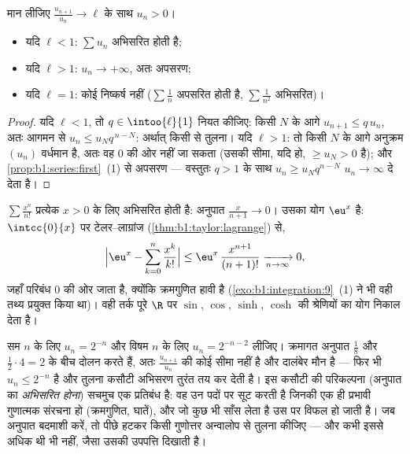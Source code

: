 \begin{theorem}[अनुपात कसौटी (दालंबेर)]\label{thm:b1:series:ratio}
मान लीजिए $\frac{u_{n+1}}{u_n} \to \ell$ के साथ $u_n > 0$।
\begin{itemize}
  \item यदि $\ell < 1$: $\sum u_n$ अभिसरित होती है;
  \item यदि $\ell > 1$: $u_n \to +\infty$, अतः अपसरण;
  \item यदि $\ell = 1$: कोई निष्कर्ष नहीं ($\sum \frac1n$ अपसरित होती है,
  $\sum \frac{1}{n^2}$ अभिसरित)।
\end{itemize}
\end{theorem}

\begin{proof}
यदि $\ell < 1$, तो $q \in \intoo{\ell}{1}$ नियत कीजिए: किसी $N$ के आगे
$u_{n+1} \leq q\,u_n$, अतः आगमन से $u_n \leq u_N q^{\,n-N}$: अर्थात् किसी
 से तुलना। यदि $\ell > 1$: तो किसी $N$ के आगे अनुक्रम $(u_n)$
वर्धमान है, अतः वह $0$ की ओर नहीं जा सकता (उसकी सीमा, यदि हो, $\geq u_N > 0$
है); और \cref{prop:b1:series:first}~(1) से अपसरण --- वस्तुतः $q > 1$ के साथ
$u_n \geq u_N q^{n-N}$ $u_n \to \infty$ दे देता है।
\end{proof}

\begin{example}\label{ex:b1:series:ratio}
$\sum \frac{x^n}{n!}$ प्रत्येक $x > 0$ के लिए अभिसरित होती है: अनुपात
$\frac{x}{n+1} \to 0$। उसका योग $\eu^x$ है: $\intcc{0}{x}$ पर टेलर--लाग्रांज
(\cref{thm:b1:taylor:lagrange}) से,
\[
\Bigl| \eu^x - \sum_{k=0}^{n} \frac{x^k}{k!} \Bigr|
\leq \eu^{x}\, \frac{x^{n+1}}{(n+1)!} \xrightarrow[n\to\infty]{} 0 ,
\]
जहाँ परिबंध $0$ की ओर जाता है, क्योंकि क्रमगुणित हावी है
(\cref{exo:b1:integration:9}~(1) ने भी वही तथ्य प्रयुक्त किया था)। वही तर्क
पूरे $\R$ पर $\sin$, $\cos$, $\sinh$, $\cosh$ की श्रेणियों का योग निकाल देता
है।
\end{example}

\begin{example}[अनुपात कसौटी पर्याप्त है, आवश्यक नहीं]\label{ex:b1:series:rationotnecessary}
सम $n$ के लिए $u_n = 2^{-n}$ और विषम $n$ के लिए $u_n = 2^{-n-2}$ लीजिए।
क्रमागत अनुपात $\frac{1}{8}$ और $\frac12\cdot4 = 2$ के बीच दोलन करते हैं,
अतः $\frac{u_{n+1}}{u_n}$ की कोई सीमा नहीं है और दालंबेर मौन है --- फिर भी
$u_n \leq 2^{-n}$ है और तुलना कसौटी अभिसरण तुरंत तय कर देती है। इस कसौटी की
परिकल्पना (अनुपात का \emph{अभिसरित होना}) सचमुच एक प्रतिबंध है: वह उन पदों
पर सूट करती है जिनकी एक ही प्रभावी गुणात्मक संरचना हो (क्रमगुणित, घातें), और
जो कुछ भी साँस लेता है उस पर विफल हो जाती है। जब अनुपात बदमाशी करें, तो पीछे
हटकर किसी गुणोत्तर अन्वालोप से तुलना कीजिए --- और  कभी इससे अधिक
थी भी नहीं, जैसा उसकी उपपत्ति दिखाती है।
\end{example}

